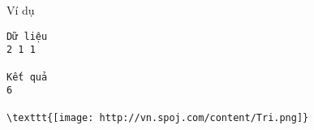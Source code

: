 Ví dụ
\begin{verbatim}
Dữ liệu
2 1 1	

Kết quả
6 

\texttt{[image: http://vn.spoj.com/content/Tri.png]}\end{verbatim}